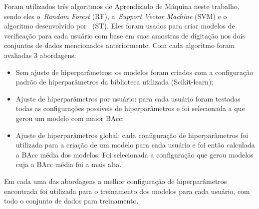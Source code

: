 Foram utilizados três algoritmos de Aprendizado de Máquina neste trabalho, sendo eles o~\textit{Random Forest} (RF), a~\textit{Support Vector Machine} (SVM) e o algoritmo desenvolvido por~ (ST). Eles foram usados para criar modelos de verificação para cada usuário com base em suas amostras de digitação nos dois conjuntos de dados mencionados anteriormente. Com cada algoritmo foram avaliadas 3 abordagens:

\begin{itemize}
    \item Sem ajuste de hiperparâmetros: os modelos foram criados com a configuração padrão de hiperparâmetros da biblioteca utilizada (Scikit-learn);
    \item Ajuste de hiperparâmetros por usuário: para cada usuário foram testadas todas as configurações possíveis de hiperparâmetros e foi selecionada a que gerou um modelo com maior BAcc;
    \item Ajuste de hiperparâmetros global: cada configuração de hiperparâmetros foi utilizada para a criação de um modelo para cada usuário e foi então calculada a BAcc média dos modelos. Foi selecionada a configuração que gerou modelos cuja a BAcc média foi a mais alta. 
\end{itemize}

Em cada uma das abordagens a melhor configuração de hiperparâmetros encontrada foi utilizada para o treinamento dos modelos para cada usuário, com todo o conjunto de dados para treinamento.
